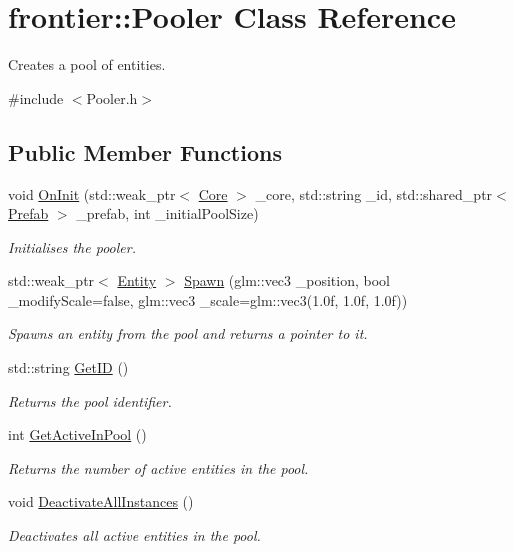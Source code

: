 \hypertarget{classfrontier_1_1_pooler}{}\section{frontier\+:\+:Pooler Class Reference}
\label{classfrontier_1_1_pooler}


Creates a pool of entities.  




{\ttfamily \#include $<$Pooler.\+h$>$}

\subsection*{Public Member Functions}
\begin{DoxyCompactItemize}
\item 
void \hyperlink{classfrontier_1_1_pooler_aae025d63772f4b794c743974586e2cab}{On\+Init} (std\+::weak\+\_\+ptr$<$ \hyperlink{classfrontier_1_1_core}{Core} $>$ \+\_\+core, std\+::string \+\_\+id, std\+::shared\+\_\+ptr$<$ \hyperlink{classfrontier_1_1_prefab}{Prefab} $>$ \+\_\+prefab, int \+\_\+initial\+Pool\+Size)
\begin{DoxyCompactList}\small\item\em Initialises the pooler. \end{DoxyCompactList}\item 
std\+::weak\+\_\+ptr$<$ \hyperlink{classfrontier_1_1_entity}{Entity} $>$ \hyperlink{classfrontier_1_1_pooler_a49c30c8f2df300b4c49b9ea6476d2c3f}{Spawn} (glm\+::vec3 \+\_\+position, bool \+\_\+modify\+Scale=false, glm\+::vec3 \+\_\+scale=glm\+::vec3(1.\+0f, 1.\+0f, 1.\+0f))
\begin{DoxyCompactList}\small\item\em Spawns an entity from the pool and returns a pointer to it. \end{DoxyCompactList}\item 
std\+::string \hyperlink{classfrontier_1_1_pooler_a701a377a0be49d7fdf95df383c5ee873}{Get\+ID} ()
\begin{DoxyCompactList}\small\item\em Returns the pool identifier. \end{DoxyCompactList}\item 
int \hyperlink{classfrontier_1_1_pooler_abce85fe89ac04c600e447d3b722f6fc2}{Get\+Active\+In\+Pool} ()
\begin{DoxyCompactList}\small\item\em Returns the number of active entities in the pool. \end{DoxyCompactList}\item 
void \hyperlink{classfrontier_1_1_pooler_ad4dced5034fd806568b03f59f0bcb4a7}{Deactivate\+All\+Instances} ()
\begin{DoxyCompactList}\small\item\em Deactivates all active entities in the pool. \end{DoxyCompactList}\end{DoxyCompactItemize}


